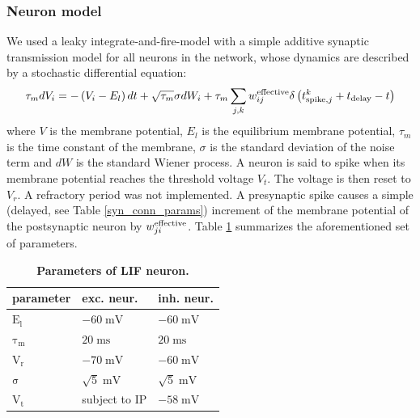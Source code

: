 \documentclass[10pt,letterpaper]{article}
\begin{document}
\subsubsection*{Neuron model}
We used a leaky integrate-and-fire-model with a simple additive synaptic transmission model for all neurons in the network, whose dynamics are described by a stochastic differential equation:
\begin{equation}
{\tau_m}dV_i = -\left( V_i-E_l \right) dt + \sqrt{\tau_m} \sigma dW_i + \tau_m \sum_{j,k} w^{\rm effective}_{ij}\delta \left( t^k_{\mathrm{spike},j} + t_{\rm delay} - t \right)
\label{LIF_Dynamics}
\end{equation}
where $V$ is the membrane potential, $E_l$ is the equilibrium membrane potential, $\tau_m$ is the time constant of the membrane, $\sigma$ is the standard deviation of the noise term and $dW$ is the standard Wiener process. A neuron is said to spike when its membrane potential reaches the threshold voltage $V_t$. The voltage is then reset to $V_r$. A refractory period was not implemented. A presynaptic spike causes a simple (delayed, see Table \ref{syn_conn_params}) increment of the membrane potential of the postsynaptic neuron by $w^{\rm effective}_{ji}$. Table \ref{LIF_neuron_params} summarizes the aforementioned set of parameters.
\begin{table}
\caption{\bf Parameters of LIF neuron.}
\begin{tabular}{|l|l|l|}
\hline
\textbf{parameter} & \textbf{exc. neur.} & \textbf{inh. neur.}\\ \hline
$\mathrm{E_l}$ & $\mathrm{-60\;mV}$ & $\mathrm{-60\;mV}$ \\ \hline
$\mathrm{\tau_m}$ & $\mathrm{20\;ms}$ & $\mathrm{20\;ms}$ \\ \hline
$\mathrm{V_r}$ & $\mathrm{-70\;mV}$ & $\mathrm{-60\;mV}$ \\ \hline
$\mathrm{\sigma}$ & $\mathrm{\sqrt{5}\;mV}$ & $\mathrm{\sqrt{5}\;mV}$ \\ \hline
$\mathrm{V_t}$ & subject to IP & $\mathrm{-58\;mV}$ \\ 
\hline
\end{tabular}
\label{LIF_neuron_params}
\end{table}   
\end{document}
